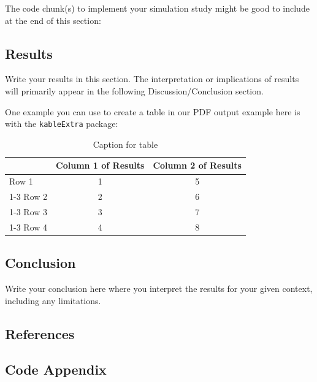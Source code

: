 \documentclass[
  twocolumn]{article}
\newlength{\cslhangindent}
\newenvironment{CSLReferences}[2] %
 {\begin{list}{}{%
  \setlength{\itemindent}{0pt}
  \setlength{\leftmargin}{0pt}
  \setlength{\parsep}{0pt}
  \ifodd #1
   \setlength{\leftmargin}{\cslhangindent}
   \setlength{\itemindent}{-1\cslhangindent}
  \fi
  \setlength{\itemsep}{#2\baselineskip}}}
 {\end{list}}
\begin{document}
The code chunk(s) to implement your simulation study might be good to include at the end of this section:

\subsection{Results}\label{results}

Write your results in this section. The interpretation or implications of results will primarily appear in the following Discussion/Conclusion section.

One example you can use to create a table in our PDF output example here is with the \texttt{kableExtra} package:

\begin{table}[H]
\centering
\caption{\label{tab:result-table}Caption for table}
\centering
\begin{tabular}[t]{lcc}
\toprule
  & Column 1 of Results & Column 2 of Results\\
\midrule
Row 1 & 1 & 5\\
\cmidrule{1-3}
Row 2 & 2 & 6\\
\cmidrule{1-3}
Row 3 & 3 & 7\\
\cmidrule{1-3}
Row 4 & 4 & 8\\
\bottomrule
\end{tabular}
\end{table}

\subsection{Conclusion}\label{conclusion}

Write your conclusion here where you interpret the results for your given context, including any limitations.

\newpage
\onecolumn

\subsection{References}\label{references}

\vspace{2mm}

\label{refs}
\begin{CSLReferences}{0}{1}
\end{CSLReferences}

\subsection{Code Appendix}\label{code-appendix}
\end{document}
